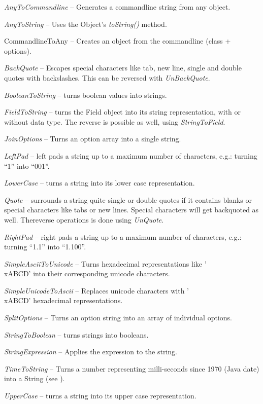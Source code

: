 \begin{tight_itemize}
	\item \textit{AnyToCommandline} -- Generates a commandline string from any
	object.
	\item \textit{AnyToString} -- Uses the Object's \textit{toString()} method.
	\item CommandlineToAny -- Creates an object from the commandline (class +
	options).
	\item \textit{BackQuote} -- Escapes special characters like tab, new line, 
	single and double quotes with backslashes. This can be reversed with 
	\textit{UnBackQuote}.
	\item \textit{BooleanToString} -- turns boolean values into strings.
	\item \textit{FieldToString} -- turns the Field object into its string
	representation, with or without data type. The reverse is possible as well,
	using \textit{StringToField}.
	\item \textit{JoinOptions} -- Turns an option array into a single string.
	\item \textit{LeftPad} -- left pads a string up to a maximum number of
	characters, e.g.: turning ``1'' into ``001''.
	\item \textit{LowerCase} -- turns a string into its lower case representation.
	\item \textit{Quote} -- surrounds a string quite single or double quotes
	if it contains blanks or special characters like tabs or new lines. Special
	characters will get backquoted as well. Thereverse operations is done 
	using \textit{UnQuote}.
	\item \textit{RightPad} -- right pads a string up to a maximum number of
	characters, e.g.: turning ``1.1'' into ``1.100''.
	\item \textit{SimpleAsciiToUnicode} -- Turns hexadecimal representations
	like '\\xABCD' into their corresponding unicode characters.
	\item \textit{SimpleUnicodeToAscii} -- Replaces unicode characters with
	'\\xABCD' hexadecimal representations.
	\item \textit{SplitOptions} -- Turns an option string into an array of individual options.
	\item \textit{StringToBoolean} -- turns strings into booleans.
	\item \textit{StringExpression} -- Applies the expression to the string.
	\item \textit{TimeToString} -- Turns a number representing milli-seconds since
	1970 (Java date) into a String (see \cite{dateformat}).
	\item \textit{UpperCase} -- turns a string into its upper case representation.
\end{tight_itemize}
